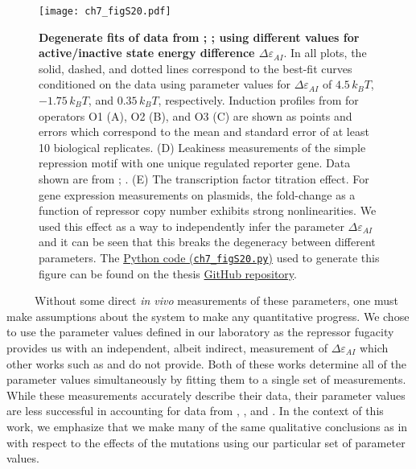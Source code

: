 \documentclass[12pt]{caltech_thesis}
\begin{document}
\hypertarget{fig:lit_degeneracy}{%
\begin{figure}
\centering
\texttt{[image: ch7\_figS20.pdf]}
\caption[{Degenerate fits of data using parameter values from the
literature.}]{\textbf{Degenerate fits of data from
\textcite{razo-mejia2018}; \textcite{brewster2014};
\textcite{garcia2011} using different values for active/inactive state
energy difference \(\Delta\varepsilon_{AI}\)}. In all plots, the solid,
dashed, and dotted lines correspond to the best-fit curves conditioned
on the data using parameter values for \(\Delta\varepsilon_{AI}\) of
\(4.5\, k_BT\), \(-1.75\, k_BT\), and \(0.35\, k_BT\), respectively.
Induction profiles from \textcite{razo-mejia2018} for operators O1 (A),
O2 (B), and O3 (C) are shown as points and errors which correspond to
the mean and standard error of at least 10 biological replicates. (D)
Leakiness measurements of the simple repression motif with one unique
regulated reporter gene. Data shown are from \textcite{garcia2011};
\textcite{brewster2014}. (E) The transcription factor titration effect.
For gene expression measurements on plasmids, the fold-change as a
function of repressor copy number exhibits strong nonlinearities. We
used this effect as a way to independently infer the parameter
\(\Delta\varepsilon_{AI}\) and it can be seen that this breaks the
degeneracy between different parameters. The
\href{https://github.com/gchure/phd/blob/master/src/chapter_07/code/ch7_figS20.py}{Python
code (\texttt{ch7\_figS20.py})} used to generate this figure can be
found on the thesis \href{https://github.com/gchure/phd}{GitHub
repository}.}
\label{fig:lit_degeneracy}
\end{figure}
}

~~~~~Without some direct \emph{in vivo} measurements of these
parameters, one must make assumptions about the system to make any
quantitative progress. We chose to use the parameter values defined in
our laboratory as the repressor fugacity provides us with an
independent, albeit indirect, measurement of \(\Delta\varepsilon_{AI}\)
which other works such as \textcite{daber2011} and
\textcite{ogorman1980} do not provide. Both of these works determine all
of the parameter values simultaneously by fitting them to a single set
of measurements. While these measurements accurately describe their
data, their parameter values are less successful in accounting for data
from \textcite{brewster2014}, \textcite{garcia2011}, and
\textcite{razo-mejia2018}. In the context of this work, we emphasize
that we make many of the same qualitative conclusions as in
\textcite{daber2011} with respect to the effects of the mutations using
our particular set of parameter values.
\end{document}
